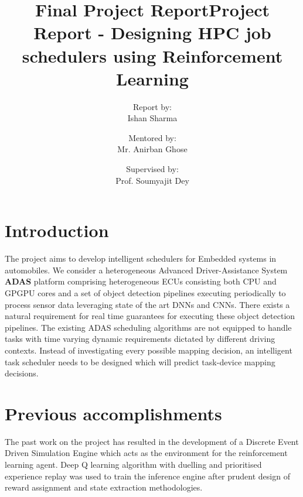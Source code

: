 \documentclass[10pt,a4paper]{article}
\title{Final Project Report}
\begin{document}
\title{\textbf{Project Report - Designing HPC job schedulers using Reinforcement Learning}}
\author{
  Report by: \\
  Ishan Sharma
  \and
  Mentored by: \\
  Mr. Anirban Ghose
  \and
  Supervised by: \\
  Prof. Soumyajit Dey
}
\date{}
\maketitle

\makeatletter
\newcommand\thefontsize[1]{{#1 The current font size is: \f@size pt\par}}
\makeatother


\section{Introduction}
\begin{normalsize}
The project aims to develop intelligent schedulers for Embedded systems in automobiles. We consider a heterogeneous Advanced Driver-Assistance System 
\textbf{ADAS} platform comprising heterogeneous ECUs consisting both CPU and GPGPU cores and a set of object detection pipelines executing periodically to process sensor data leveraging state of the art DNNs and CNNs. There exists a natural requirement for real time guarantees for executing these object detection pipelines. The existing ADAS scheduling algorithms are not equipped to handle tasks with time varying dynamic requirements dictated by different driving contexts. Instead of investigating every possible mapping decision, an intelligent task scheduler needs to be designed which will predict task-device mapping decisions. 
\end{normalsize}

\section{Previous accomplishments}
\begin{normalsize}
The past work on the project has resulted in the development of a Discrete Event Driven Simulation Engine which acts as the environment for the reinforcement learning agent. Deep Q learning algorithm with duelling and prioritised experience replay was used to train the inference engine after prudent design of reward assignment and state extraction methodologies.
\end{normalsize}
\end{document}

